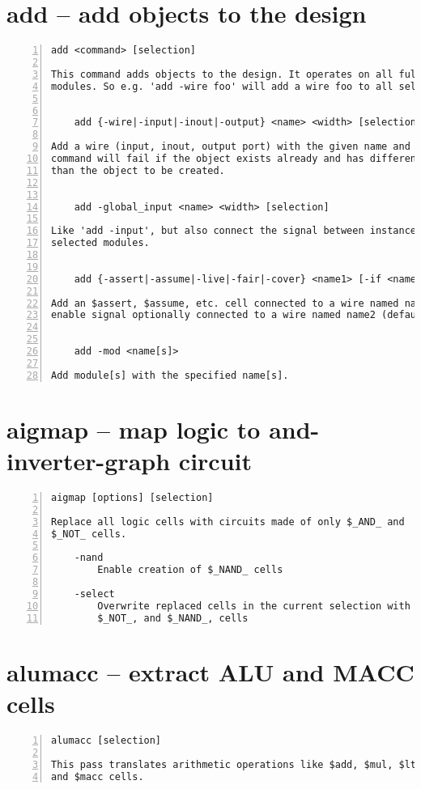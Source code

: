 \section{add -- add objects to the design}
\label{cmd:add}
\begin{lstlisting}[numbers=left,frame=single]
    add <command> [selection]

This command adds objects to the design. It operates on all fully selected
modules. So e.g. 'add -wire foo' will add a wire foo to all selected modules.


    add {-wire|-input|-inout|-output} <name> <width> [selection]

Add a wire (input, inout, output port) with the given name and width. The
command will fail if the object exists already and has different properties
than the object to be created.


    add -global_input <name> <width> [selection]

Like 'add -input', but also connect the signal between instances of the
selected modules.


    add {-assert|-assume|-live|-fair|-cover} <name1> [-if <name2>]

Add an $assert, $assume, etc. cell connected to a wire named name1, with its
enable signal optionally connected to a wire named name2 (default: 1'b1).


    add -mod <name[s]>

Add module[s] with the specified name[s].
\end{lstlisting}

\section{aigmap -- map logic to and-inverter-graph circuit}
\label{cmd:aigmap}
\begin{lstlisting}[numbers=left,frame=single]
    aigmap [options] [selection]

Replace all logic cells with circuits made of only $_AND_ and
$_NOT_ cells.

    -nand
        Enable creation of $_NAND_ cells

    -select
        Overwrite replaced cells in the current selection with new $_AND_,
        $_NOT_, and $_NAND_, cells
\end{lstlisting}

\section{alumacc -- extract ALU and MACC cells}
\label{cmd:alumacc}
\begin{lstlisting}[numbers=left,frame=single]
    alumacc [selection]

This pass translates arithmetic operations like $add, $mul, $lt, etc. to $alu
and $macc cells.
\end{lstlisting}

